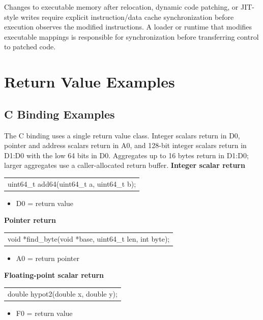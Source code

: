 \documentclass[10pt,twoside]{article}
\begin{document}
Changes to executable memory after relocation, dynamic code patching, or
JIT-style writes require explicit instruction/data cache synchronization before
execution observes the modified instructions. A loader or runtime that modifies
executable mappings is responsible for synchronization before transferring
control to patched code.


\clearpage
\section{Return Value Examples}
\subsection{C Binding Examples}
The C binding uses a single return value class. Integer scalars return in D0, pointer and address scalars return in A0, and 128-bit integer scalars return in D1:D0 with the low 64 bits in D0. Aggregates up to 16 bytes return in D1:D0; larger aggregates use a caller-allocated return buffer.
\Needspace{1.45in}
\noindent\textbf{Integer scalar return}\par
\begingroup\small\ttfamily
\begin{tabularx}{\linewidth}{@{}X@{}}
uint64\_t add64(uint64\_t a, uint64\_t b);\tabularnewline
\end{tabularx}
\endgroup
\begin{itemize}
\item D0 = return value
\end{itemize}
\Needspace{1.45in}
\noindent\textbf{Pointer return}\par
\begingroup\small\ttfamily
\begin{tabularx}{\linewidth}{@{}X@{}}
void *find\_byte(void *base, uint64\_t len, int byte);\tabularnewline
\end{tabularx}
\endgroup
\begin{itemize}
\item A0 = return pointer
\end{itemize}
\Needspace{1.45in}
\noindent\textbf{Floating-point scalar return}\par
\begingroup\small\ttfamily
\begin{tabularx}{\linewidth}{@{}X@{}}
double hypot2(double x, double y);\tabularnewline
\end{tabularx}
\endgroup
\begin{itemize}
\item F0 = return value
\end{itemize}
\Needspace{1.45in}
\end{document}

